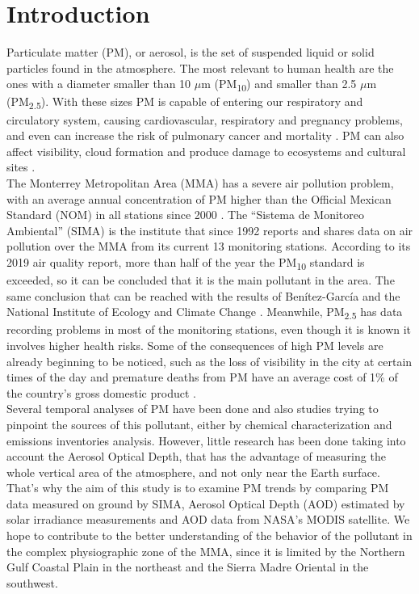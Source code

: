 \section{Introduction}
Particulate matter (PM), or aerosol, is the set of suspended liquid or solid particles found in the atmosphere. The most relevant to human health are the ones with a diameter smaller than 10 $\mu$m (PM\textsubscript{10}) and smaller than 2.5 $\mu$m (PM\textsubscript{2.5}). With these sizes PM is capable of entering our respiratory and circulatory system, causing cardiovascular, respiratory and pregnancy problems, and even can increase the risk of pulmonary cancer and mortality \cite{Mukherjee2017}. PM can also affect visibility, cloud formation and produce damage to ecosystems and cultural sites \cite{von2015}.\\

The Monterrey Metropolitan Area (MMA) has a severe air pollution problem, with an average annual concentration of PM higher than the Official Mexican Standard (NOM) in all stations since 2000 \cite{martinez2016}. The ``Sistema de Monitoreo Ambiental” (SIMA) is the institute that since 1992 reports and shares data on air pollution over the MMA from its current 13 monitoring stations. According to its 2019 air quality report, more than half of the year the PM\textsubscript{10} standard is exceeded, so it can be concluded that it is the main pollutant in the area. The same conclusion that can be reached with the results of Benítez-García \cite{benitez2014} and the National Institute of Ecology and Climate Change \cite{inecc2011,inecc2019}. Meanwhile, PM\textsubscript{2.5} has data recording problems in most of the monitoring stations, even though it is known it involves higher health risks. Some of the consequences of high PM levels are already beginning to be noticed, such as the loss of visibility in the city at certain times of the day and premature deaths from PM have an average cost of 1\% of the country's gross domestic product \cite{itdp2019}.\\

Several temporal analyses of PM have been done and also studies trying to pinpoint the sources of this pollutant, either by chemical characterization and emissions inventories analysis. However, little research has been done taking into account the Aerosol Optical Depth, that has the advantage of measuring the whole vertical area of the atmosphere, and not only near the Earth surface. That’s why the aim of this study is to examine PM trends by comparing PM data measured on ground by SIMA, Aerosol Optical Depth (AOD) estimated by solar irradiance measurements and AOD data from NASA’s MODIS satellite. We hope to contribute to the better understanding of the behavior of the pollutant in the complex physiographic zone of the MMA, since it is limited by the Northern Gulf Coastal Plain in the northeast and the Sierra Madre Oriental in the southwest.\\

